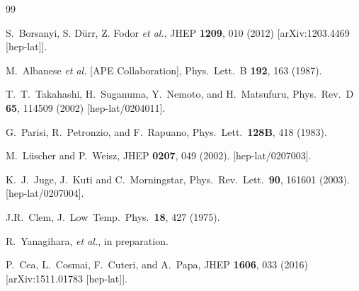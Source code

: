 \documentclass[3p,twocolumn,sort&compress]{elsarticle}
\begin{document}
\begin{thebibliography}{99}

  S.~Borsanyi, S. D\"{u}rr, Z. Fodor {\it et al.},
  JHEP {\bf 1209}, 010 (2012)
  [arXiv:1203.4469 [hep-lat]].



  M.~Albanese {\it et al.} [APE Collaboration],
  Phys.\ Lett.\ B {\bf 192}, 163 (1987).
	
  T.~T.~Takahashi, H.~Suganuma, Y.~Nemoto, and H.~Matsufuru,
  Phys.\ Rev.\ D {\bf 65}, 114509 (2002)
  [hep-lat/0204011].

  G.~Parisi, R.~Petronzio, and F.~Rapuano,
  Phys.\ Lett.\  {\bf 128B}, 418 (1983).



  M.~L\"uscher and P.~Weisz,
  JHEP {\bf 0207}, 049 (2002).
  [hep-lat/0207003].

  K.~J.~Juge, J.~Kuti and C.~Morningstar,
  Phys.\ Rev.\ Lett.\  {\bf 90},  161601 (2003).
  [hep-lat/0207004].


  J.R.~Clem, J.\ Low\ Temp.\ Phys.\ {\bf 18}, 427 (1975).

  R.~Yanagihara, {\it et al.}, in preparation.



  P.~Cea, L.~Cosmai, F.~Cuteri, and A.~Papa,
  JHEP {\bf 1606}, 033 (2016)
  [arXiv:1511.01783 [hep-lat]].




\end{thebibliography}
\end{document}
